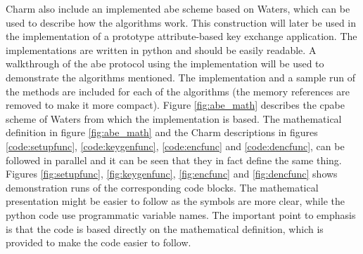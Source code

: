 Charm also include an implemented \gls{abe} scheme based on Waters\cite{abe_waters09}, which can be used to describe how the algorithms work. This construction will later be used in the implementation of a prototype attribute-based key exchange application. The implementations are written in python and should be easily readable. A walkthrough of the \gls{abe} protocol using the implementation will be used to demonstrate the algorithms mentioned. The implementation and a sample run of the methods are included for each of the algorithms (the memory references are removed to make it more compact). Figure \ref{fig:abe_math} describes the \gls{cpabe} scheme of Waters\cite{abe_waters09} from which the implementation is based. The mathematical definition in figure \ref{fig:abe_math} and the Charm descriptions in figures \ref{code:setupfunc}, \ref{code:keygenfunc}, \ref{code:encfunc} and \ref{code:dencfunc},  can be followed in parallel and it can be seen that they in fact define the same thing. Figures \ref{fig:setupfunc}, \ref{fig:keygenfunc}, \ref{fig:encfunc} and \ref{fig:dencfunc} shows demonstration runs of the corresponding code blocks. The mathematical presentation might be easier to follow as the symbols are more clear, while the python code use programmatic variable names. The important point to emphasis is that the code is based directly on the mathematical definition, which is provided to make the code easier to follow.

\clearpage

